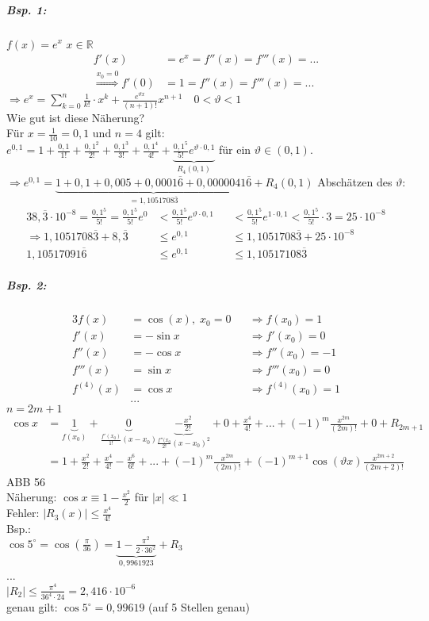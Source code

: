 \subparagraph{Bsp. 1:} $f(x) = e^x$ \qquad $x\in \mathbb{R}$
\begin{align*}
f'(x) &= e^x = f''(x) = f'''(x) = ...\\
\overset{x_0=0}{\Longrightarrow} f'(0) &= 1 = f''(x) = f'''(x) = ... 
\end{align*}
$\Rightarrow e^x = \sum_{k=0}^n \frac{1}{k!}\cdot x^k + \frac{e^{\vartheta x}}{(n+1)!}x^{n+1} \quad 0 < \vartheta <1$\\
Wie gut ist diese Näherung?\\
Für $x=\frac{1}{10}=0,1$ und $n=4$ gilt: \\
$e^{0,1}=1+\frac{0,1}{1!}+\frac{0,1^2}{2!}+\frac{0,1^3}{3!}+\frac{0,1^4}{4!}+\underbrace{\frac{0,1^5}{5!}e^{\vartheta \cdot 0,1}}_{R_4(0,1)}$ für ein $\vartheta \in (0,1)$.\\
$\Rightarrow e^{0,1} = \underbrace{1 + 0,1 + 0,005 + 0,0001\overline{6} + 0,0000041\overline{6}}_{=1,1051708\overline{3}}+R_4(0,1)$
Abschätzen des $\vartheta$:
\begin{alignat*}{3}
8,\overline{3}\cdot 10^{-8} = \frac{0,1^5}{5!}= \frac{0,1^5}{5!}e^0&< \frac{0,1^5}{5!}e^{\vartheta \cdot 0,1} &&< \frac{0,1^5}{5!} e^{1\cdot 0,1} < \frac{0,1^5}{5!}\cdot 3 = 25 \cdot 10^{-8}\\
\Rightarrow 1,1051708\overline{3} +8,\overline{3} &\leq e^{0,1} &&\leq 1,1051708\overline{3}+25\cdot 10^{-8} \\
1,10517091\overline{6} &\leq e^{0,1} &&\leq 1,10517108\overline{3}
\end{alignat*}
\subparagraph{Bsp. 2:} 
\begin{alignat*}{3}
f(x) &= \cos (x), \; x_0 = 0 &&\Rightarrow f(x_0)=1\\
f'(x)&=-\sin x && \Rightarrow f'(x_0) = 0\\
f''(x) &= -\cos x && \Rightarrow f''(x_0)=-1\\
f'''(x) &= \sin x && \Rightarrow f'''(x_0) = 0 \\
f^{(4)}(x) &= \cos x && \Rightarrow f^{(4)}(x_0) = 1 \\
&...
\end{alignat*}
$n=2m+1$
\begin{align*}
\cos x &= \underbrace{1}_{f(x_0)}+\underbrace{0}_{\frac{f'(x_0)}{1!}(x-x_0)}\underbrace{-\frac{x^2}{2!}}_{\frac{f''(x_0}{2!}(x-x_0)^2}+0+\frac{x^4}{4!}+...+ (-1)^m \frac{x^{2m}}{(2m)!}+0+R_{2m+1}\\
&= 1 + \frac{x^2}{2!} + \frac{x^4}{4!} - \frac{x^6}{6!}+...+(-1)^m\frac{x^{2m}}{(2m)!}+(-1)^{m+1}\cos (\vartheta x) \frac{x^{2m+2}}{(2m+2)!}
\end{align*}
ABB 56\\
Näherung: $\cos x \equiv 1-\frac{x^2}{2}$ für $|x| \ll 1$\\
Fehler: $|R_3(x)| \leq \frac{x^4}{4!}$\\
Bsp.:\\
$\cos 5^\circ = \cos \left( \frac{\pi}{36}\right) = \underbrace{1-\frac{\pi^2}{2 \cdot 36^2}}_{0,9961923}+ R_3$\\
...\\
$|R_2| \leq \frac{\pi^4}{36^4\cdot 24}= 2,416\cdot 10^{-6}$\\
genau gilt: $\cos 5^\circ = 0,99619 $ (auf 5 Stellen genau)

